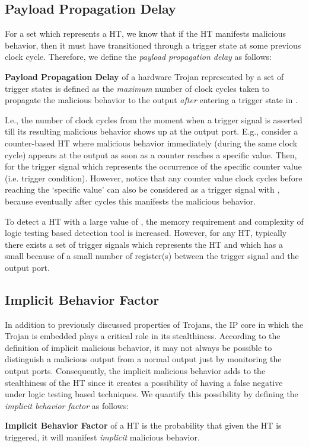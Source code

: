 \documentclass[10pt,journal,compsoc]{IEEEtran}
\begin{document}
\subsection{Payload Propagation Delay }
For a set  which represents a HT, we know that if the HT manifests malicious behavior, then it must have transitioned through a trigger state  at some previous clock cycle. 
Therefore, we define the \textit{payload propagation delay}  as follows:
\begin{definition}
\textbf{Payload Propagation Delay \boldmath{}} of a hardware Trojan represented by a set of trigger states  is defined as the {\em maximum} number of clock cycles taken to propagate the malicious behavior to the output \textit{after} entering a trigger state in . 
\end{definition}


I.e., the number of clock cycles from the moment when a trigger signal is asserted till its resulting malicious behavior shows up at the output port.
E.g., consider a counter-based HT where malicious behavior immediately (during the same clock cycle) appears at the output as soon as a counter reaches a specific value. 
Then,  for the trigger signal  which represents the occurrence of the specific counter value (i.e. trigger condition).
However, notice that any counter value  clock cycles before reaching the `specific value' can also be considered as a trigger signal  with , because eventually after  cycles this  manifests the malicious behavior.


To detect a HT with a large value of , the memory requirement and complexity of logic testing based detection tool is increased.
However, for any HT, typically there exists a set of trigger signals which represents the HT and which has a small  because of a small number of register(s) between the trigger signal and the output port.



\subsection{Implicit Behavior Factor }
In addition to previously discussed properties of Trojans, the IP core in which the Trojan is embedded plays a critical role in its stealthiness.
According to the definition of implicit malicious behavior, it may not always be possible to distinguish a malicious output from a normal output just by monitoring the output ports.
Consequently, the implicit malicious behavior adds to the stealthiness of the HT since it creates a possibility of having a false negative under logic testing based techniques.
We quantify this possibility by defining the \textit{implicit behavior factor}  as follows:
\begin{definition}
\label{def:aplha}
\textbf{Implicit Behavior Factor \boldmath{}} of a HT is the probability that given the HT is triggered, it will manifest {\em implicit} malicious behavior.
\end{definition}
\end{document}
